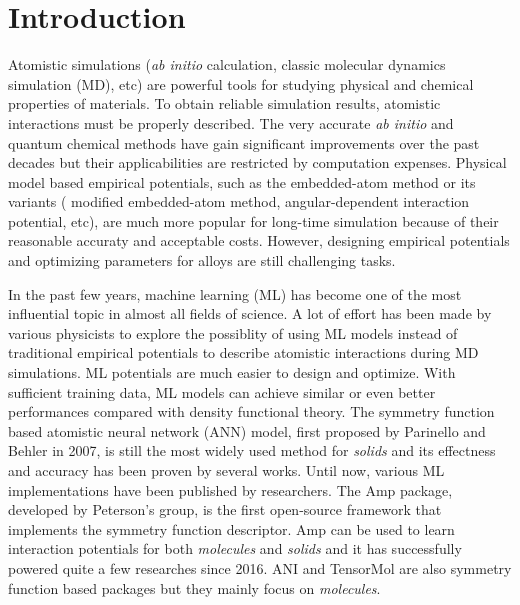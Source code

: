 \documentclass[preprint]{revtex4-2}
\begin{document}
\newcommand{\tensoralloy}{\textbf{TensorAlloy}}

% 
%
\newpage

\section{Introduction}

Atomistic simulations (\textit{ab initio} calculation, classic molecular 
dynamics simulation (MD), etc) are powerful tools for studying physical and 
chemical properties of materials. To obtain reliable simulation results, 
atomistic interactions must be properly described. The very accurate 
\textit{ab initio} and quantum chemical methods have gain significant 
improvements over the past decades but their applicabilities are restricted by 
computation expenses. Physical model based empirical potentials, such as the 
embedded-atom method\cite{eam-1,eam-2,eam-3,eam-4,eam-5} or its variants (
modified embedded-atom method\cite{eam-5,meam-1,meam-2,meam-3}, 
angular-dependent interaction potential\cite{adp-1,adp-2,adp-3}, etc), are much 
more popular for long-time simulation because of their reasonable accuraty and 
acceptable costs. 
However, designing empirical potentials and optimizing parameters for 
alloys are still challenging tasks\cite{eam-5, adp-2, SNAP_2018}. 

In the past few years, machine learning (ML) has become one of the most 
influential topic in almost all fields of science. A lot of effort has been made 
by various physicists to explore the possiblity of using ML models \textemdash 
instead of traditional empirical potentials \textemdash to describe atomistic 
interactions during MD simulations\cite{kCON,SchNet,DTNN,SNAP_2018,SNAP_Mo_2017,
ANI,TensorMol}. ML potentials are much easier to design and 
optimize. With sufficient training data, ML models can achieve similar or even 
better performances compared with density functional theory.
The symmetry function based atomistic neural network (ANN) model, first proposed 
by Parinello and Behler in 2007\cite{Behler,Behler2,Behler3,Behler4,Behler1}, 
is still the most widely used method for \textit{solids} and its effectness and 
accuracy has been proven by several 
works\cite{Behler-solids-lzp-1,Behler-alloy-1,Behler-alloy-2, Behler-alloy-3}.
Until now, various ML implementations\cite{AMP,ANI,TensorMol} have been 
published by researchers. The Amp\cite{AMP} package, developed by Peterson's 
group, is the first open-source framework that implements the symmetry function 
descriptor. Amp can be used to learn interaction potentials for both 
\textit{molecules} and \textit{solids} and it has successfully powered quite a 
few researches since 2016\cite{Amp-works-hammer,amp-work-1}. ANI\cite{ANI} and 
TensorMol\cite{TensorMol} are also symmetry function based packages but they 
mainly focus on \textit{molecules}.
\end{document}

